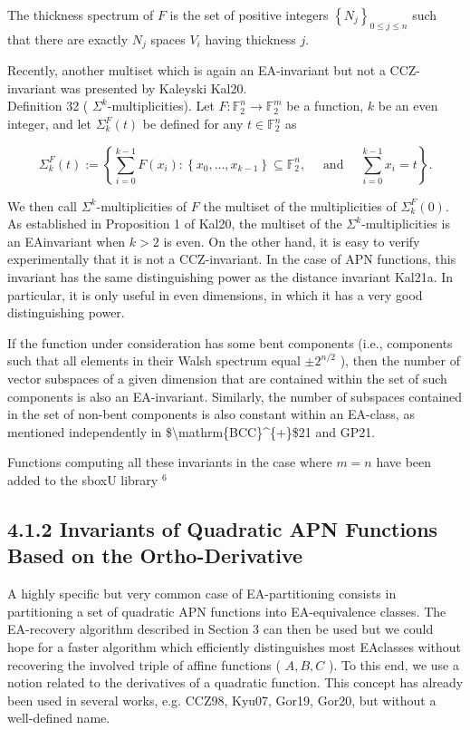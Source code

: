 \documentclass[10pt]{article}
\begin{document}
The thickness spectrum of $F$ is the set of positive integers $\left\{N_{j}\right\}_{0 \leqslant j \leqslant n}$ such that there are exactly $N_{j}$ spaces $V_{i}$ having thickness $j$.

Recently, another multiset which is again an EA-invariant but not a CCZ-invariant was presented by Kaleyski Kal20.\\
Definition 32 ( $\Sigma^{k}$-multiplicities). Let $F: \mathbb{F}_{2}^{n} \rightarrow \mathbb{F}_{2}^{m}$ be a function, $k$ be an even integer, and let $\Sigma_{k}^{F}(t)$ be defined for any $t \in \mathbb{F}_{2}^{n}$ as

$$
\Sigma_{k}^{F}(t):=\left\{\sum_{i=0}^{k-1} F\left(x_{i}\right):\left\{x_{0}, \ldots, x_{k-1}\right\} \subseteq \mathbb{F}_{2}^{n}, \quad \text { and } \quad \sum_{i=0}^{k-1} x_{i}=t\right\} .
$$

We then call $\Sigma^{k}$-multiplicities of $F$ the multiset of the multiplicities of $\Sigma_{k}^{F}(0)$.\\
As established in Proposition 1 of Kal20, the multiset of the $\Sigma^{k}$-multiplicities is an EAinvariant when $k>2$ is even. On the other hand, it is easy to verify experimentally that it is not a CCZ-invariant. In the case of APN functions, this invariant has the same distinguishing power as the distance invariant Kal21a. In particular, it is only useful in even dimensions, in which it has a very good distinguishing power.

If the function under consideration has some bent components (i.e., components such that all elements in their Walsh spectrum equal $\pm 2^{n / 2}$ ), then the number of vector subspaces of a given dimension that are contained within the set of such components is also an EA-invariant. Similarly, the number of subspaces contained in the set of non-bent components is also constant within an EA-class, as mentioned independently in \$\textbackslash mathrm\{BCC\}\^{}\{+\}\$21 and GP21.

Functions computing all these invariants in the case where $m=n$ have been added to the sboxU library ${ }^{6}$

\subsection*{4.1.2 Invariants of Quadratic APN Functions Based on the Ortho-Derivative}
A highly specific but very common case of EA-partitioning consists in partitioning a set of quadratic APN functions into EA-equivalence classes. The EA-recovery algorithm described in Section 3 can then be used but we could hope for a faster algorithm which efficiently distinguishes most EAclasses without recovering the involved triple of affine functions ( $A, B, C$ ). To this end, we use a notion related to the derivatives of a quadratic function. This concept has already been used in several works, e.g. CCZ98, Kyu07, Gor19, Gor20, but without a well-defined name.
\end{document}
